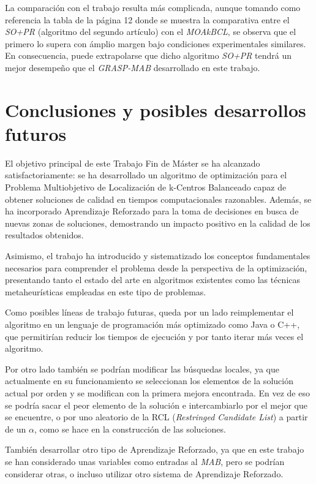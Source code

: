 \documentclass[12pt,a4paper]{book}
\begin{document}
La comparación con el trabajo \cite{k-Balanced_2} resulta más complicada, aunque tomando como referencia la tabla de la página 12 donde se muestra la comparativa entre el \textit{SO+PR} (algoritmo del segundo artículo) con el \textit{MOAkBCL}, se observa que el primero lo supera con ámplio margen bajo
condiciones experimentales similares. En consecuencia, puede extrapolarse que dicho algoritmo \textit{SO+PR} tendrá un mejor desempeño que el \textit{GRASP-MAB} desarrollado en este trabajo.

\chapter{Conclusiones y posibles desarrollos futuros}
El objetivo principal de este Trabajo Fin de Máster se ha alcanzado satisfactoriamente: se ha desarrollado un algoritmo de optimización para el Problema Multiobjetivo de Localización de k-Centros Balanceado capaz de obtener soluciones de calidad en tiempos computacionales razonables. Además, se ha incorporado Aprendizaje Reforzado para la toma de decisiones en busca de nuevas zonas de soluciones,
demostrando un impacto positivo en la calidad de los resultados obtenidos.

Asimismo, el trabajo ha introducido y sistematizado los conceptos fundamentales necesarios para comprender el problema desde la perspectiva de la optimización, presentando tanto el estado del arte en algoritmos existentes como las técnicas metaheurísticas empleadas en este tipo de problemas.

Como posibles líneas de trabajo futuras, queda por un lado reimplementar el algoritmo en un lenguaje de programación más
optimizado como Java o C++, que permitirían reducir los tiempos de ejecución y por tanto iterar más veces el algoritmo.

Por otro lado también se podrían modificar las búsquedas locales, ya que actualmente en su funcionamiento se seleccionan los elementos de la solución actual por orden y se modifican
con la primera mejora encontrada. En vez de eso se podría sacar el peor elemento de la solución e intercambiarlo por el mejor que se encuentre, o por
uno aleatorio de la RCL (\textit{Restringed Candidate List}) a partir de un $\alpha$, como se hace en la construcción de las soluciones.

También desarrollar otro tipo de Aprendizaje Reforzado, ya que en este trabajo se han considerado unas variables como entradas al \textit{MAB}, pero se podrían considerar otras,
o incluso utilizar otro sistema de Aprendizaje Reforzado.
\end{document}
